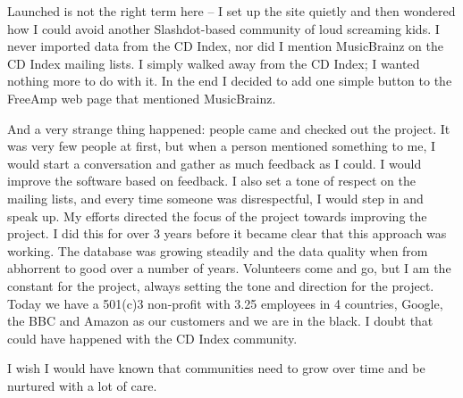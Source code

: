 Launched is not the right term here -- I set up the site quietly and then
wondered how I could avoid another Slashdot-based community of loud screaming
kids. I never imported data from the CD Index, nor did I mention MusicBrainz on
the CD Index mailing lists. I simply walked away from the CD Index; I wanted
nothing more to do with it. In the end I decided to add one simple button to the
FreeAmp web page that mentioned MusicBrainz.

And a very strange thing happened: people came and checked out the project. It
was very few people at first, but when a person mentioned something to me, I
would start a conversation and gather as much feedback as I could. I would
improve the software based on feedback. I also set a tone of respect on the
mailing lists, and every time someone was disrespectful, I would step in and
speak up. My efforts directed the focus of the project towards improving the
project. I did this for over 3 years before it became clear that this approach
was working. The database was growing steadily and the data quality when from
abhorrent to good over a number of years.  Volunteers come and go, but I am the
constant for the project, always setting the tone and direction for the project.
Today we have a 501(c)3 non-profit with 3.25 employees in 4 countries, Google,
the BBC and Amazon as our customers and we are in the black. I doubt that could
have happened with the CD Index community.

I wish I would have known that communities need to grow over time and be
nurtured with a lot of care.
